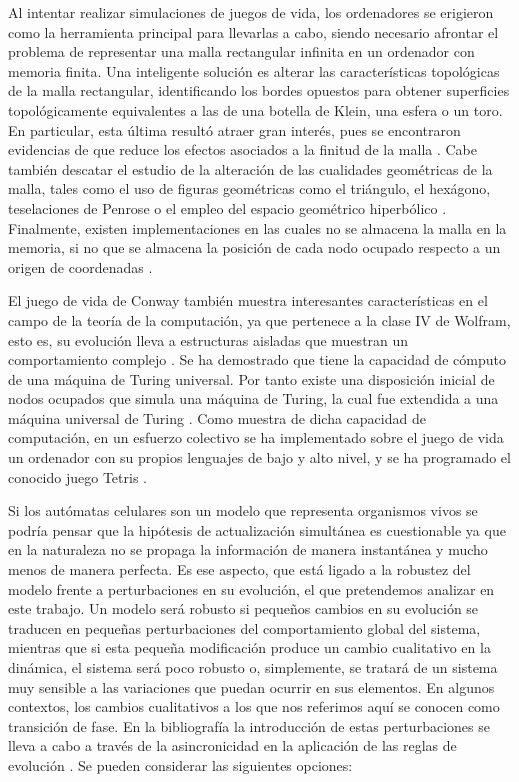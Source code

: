 \documentclass[../proyecto.tex]{book}
\begin{document}
Al intentar realizar simulaciones de juegos de vida, los ordenadores se erigieron como la herramienta principal para llevarlas a cabo, siendo necesario afrontar el problema de representar una malla rectangular infinita en un ordenador con memoria finita. Una inteligente solución es alterar las características topológicas de la malla rectangular, identificando los bordes opuestos para obtener superficies topológicamente equivalentes a las de una botella de Klein, una esfera o un toro. En particular, esta última resultó atraer gran interés, pues se encontraron evidencias de que reduce los efectos asociados a la finitud de la malla \cite{finitudMalla, finitudMalla2}. Cabe también descatar el estudio de la alteración de las cualidades geométricas de la malla, tales como el uso de figuras geométricas como el triángulo, el hexágono\cite{triangular}, teselaciones de Penrose \cite{penrose} o el empleo del espacio geométrico hiperbólico \cite{hiperbolico}. Finalmente, existen implementaciones en las cuales no se almacena la malla en la memoria, si no que se almacena la posición de cada nodo ocupado respecto a un origen de coordenadas \cite{boardless}.

El juego de vida de Conway también muestra interesantes características en el campo de la teoría de la computación, ya que pertenece a la clase IV de Wolfram, esto es, su evolución lleva a estructuras aisladas que muestran un comportamiento complejo \cite{ccuatro, ccuatro2}. Se ha demostrado que tiene la capacidad de cómputo de una máquina de Turing universal. Por tanto existe una disposición inicial de nodos ocupados que simula una máquina de Turing, la cual fue extendida a una máquina universal de Turing \cite{turingUniversal,turing}. Como muestra de dicha capacidad de computación, en un esfuerzo colectivo se ha implementado sobre el juego de vida un ordenador con su propios lenguajes de bajo y alto nivel, y se ha programado el conocido juego Tetris \cite{tetris, logical}.

Si los autómatas celulares son un modelo que representa organismos vivos se podría pensar que la hipótesis de actualización simultánea es cuestionable ya que en la naturaleza no se propaga la información de manera instantánea y mucho menos de manera perfecta. Es ese aspecto, que está ligado a la robustez del modelo frente a perturbaciones en su evolución, el que pretendemos analizar en este trabajo. Un modelo será robusto si pequeños cambios en su evolución se traducen en pequeñas perturbaciones del comportamiento global del sistema, mientras que si esta pequeña modificación produce un cambio cualitativo en la dinámica, el sistema será poco robusto o, simplemente, se tratará de un sistema muy sensible a las variaciones que puedan ocurrir en sus elementos. En algunos contextos, los cambios cualitativos a los que nos referimos aquí se conocen como transición de fase. En la bibliografía la introducción de estas perturbaciones se lleva a cabo a través de la asincronicidad en la aplicación de las reglas de evolución \cite{asyncIntro}. Se pueden considerar las siguientes opciones:
\end{document}
